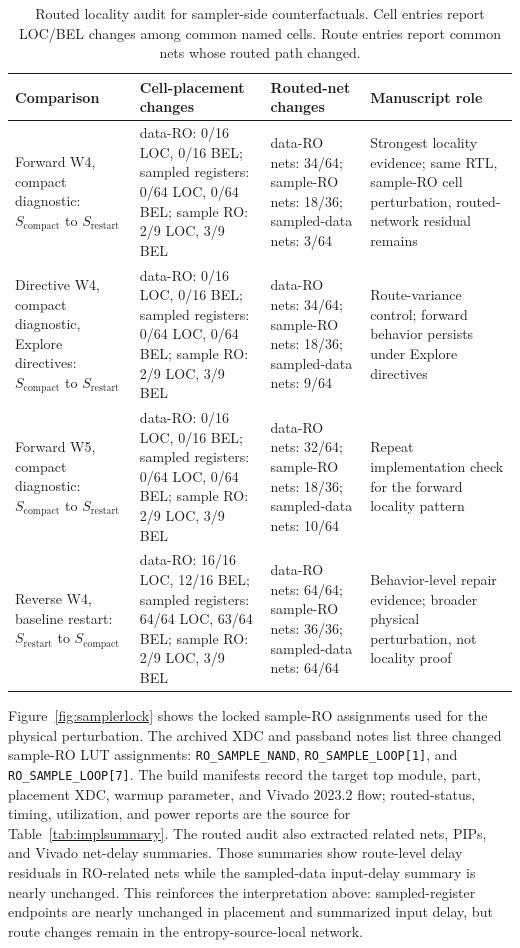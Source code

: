\documentclass[journal]{IEEEtran}
\newcommand{\scompact}{$S_\mathrm{compact}$}
\newcommand{\srestart}{$S_\mathrm{restart}$}
\begin{document}
\begin{table}[t]
\centering
\caption{Routed locality audit for sampler-side counterfactuals. Cell entries report LOC/BEL changes among common named cells. Route entries report common nets whose routed path changed.}
\label{tab:routedaudit}
\scriptsize
\begin{tabular}{@{}L{0.23\textwidth}L{0.28\textwidth}L{0.23\textwidth}L{0.16\textwidth}@{}}
\toprule
Comparison & Cell-placement changes & Routed-net changes & Manuscript role \\
\midrule
Forward W4, compact diagnostic: \scompact{} to \srestart{} & data-RO: 0/16 LOC, 0/16 BEL; sampled registers: 0/64 LOC, 0/64 BEL; sample RO: 2/9 LOC, 3/9 BEL & data-RO nets: 34/64; sample-RO nets: 18/36; sampled-data nets: 3/64 & Strongest locality evidence; same RTL, sample-RO cell perturbation, routed-network residual remains \\
Directive W4, compact diagnostic, Explore directives: \scompact{} to \srestart{} & data-RO: 0/16 LOC, 0/16 BEL; sampled registers: 0/64 LOC, 0/64 BEL; sample RO: 2/9 LOC, 3/9 BEL & data-RO nets: 34/64; sample-RO nets: 18/36; sampled-data nets: 9/64 & Route-variance control; forward behavior persists under Explore directives \\
Forward W5, compact diagnostic: \scompact{} to \srestart{} & data-RO: 0/16 LOC, 0/16 BEL; sampled registers: 0/64 LOC, 0/64 BEL; sample RO: 2/9 LOC, 3/9 BEL & data-RO nets: 32/64; sample-RO nets: 18/36; sampled-data nets: 10/64 & Repeat implementation check for the forward locality pattern \\
Reverse W4, baseline restart: \srestart{} to \scompact{} & data-RO: 16/16 LOC, 12/16 BEL; sampled registers: 64/64 LOC, 63/64 BEL; sample RO: 2/9 LOC, 3/9 BEL & data-RO nets: 64/64; sample-RO nets: 36/36; sampled-data nets: 64/64 & Behavior-level repair evidence; broader physical perturbation, not locality proof \\
\bottomrule
\end{tabular}
\end{table}

Figure~\ref{fig:samplerlock} shows the locked sample-RO assignments used for the physical perturbation. The archived XDC and passband notes list three changed sample-RO LUT assignments: \texttt{RO\_SAMPLE\_NAND}, \texttt{RO\_SAMPLE\_LOOP[1]}, and \texttt{RO\_SAMPLE\_LOOP[7]}. The build manifests record the target top module, part, placement XDC, warmup parameter, and Vivado 2023.2 flow; routed-status, timing, utilization, and power reports are the source for Table~\ref{tab:implsummary}. The routed audit also extracted related nets, PIPs, and Vivado net-delay summaries. Those summaries show route-level delay residuals in RO-related nets while the sampled-data input-delay summary is nearly unchanged. This reinforces the interpretation above: sampled-register endpoints are nearly unchanged in placement and summarized input delay, but route changes remain in the entropy-source-local network.
\end{document}

